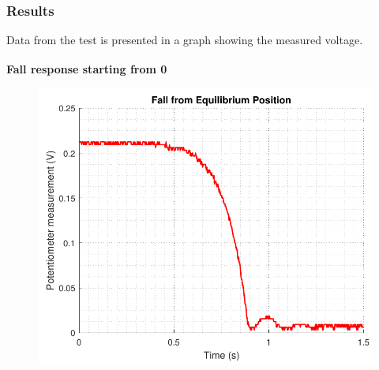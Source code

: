\subsubsection{Results}
Data from the test is presented in a graph showing the measured  voltage.

\small\textbf{Fall response starting from \si{0^\circ}}

\begin{minipage}{\linewidth}
	\begin{minipage}{0.45\linewidth}
		\begin{figure}[H]
			\includegraphics[scale=.53]{figures/FallVolt}
			\centering
			\vspace{-.4cm}
			\captionsetup{justification=centering}
			\label{FallVolt}
		\end{figure}\vspace{-5mm}
	\end{minipage}
	\hspace{0.03\linewidth}
	\begin{minipage}{0.45\linewidth}
		\begin{figure}[H]

\end{figure}
\end{minipage}
\end{minipage}
